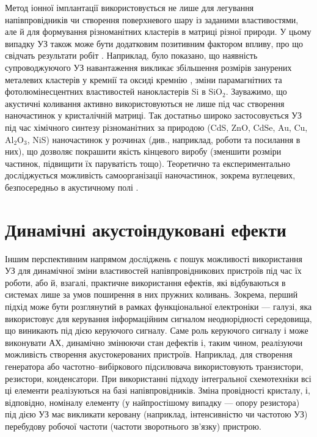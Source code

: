 Метод іонної імплантації використовується не лише для легування напівпровідників чи створення поверхневого шару із заданими властивостями, але й для формування різноманітних кластерів в матриці різної природи.
У цьому випадку УЗ також може бути додатковим позитивним фактором впливу, про що свідчать результати робіт \cite{Roman:2006JAP,Roman:2007APL,Roman:2010JAP,YOlikh2010JL}.
Наприклад, було показано, що наявність супроводжуючого УЗ навантаження викликає збільшення розмірів занурених металевих кластерів у кремнії \cite{Roman:2006JAP} та оксиді кремнію \cite{Roman:2007APL}, зміни парамагнітних \cite{Roman:2010JAP} та фотолюмінесцентних \cite{YOlikh2010JL} властивостей нанокластерів Si в SiO$_2$.
Зауважимо, що акустичні коливання активно використовуються не лише під час створення наночастинок у кристалічній матриці.
Так достатньо широко застосовується УЗ під час хімічного синтезу різноманітних за природою (CdS, ZnO, CdSe, Au, Cu, Al$_2$O$_3$, NiS) наночастинок у розчинах (див., наприклад, роботи \cite{US:nanoParticle,US:nanoCdSe,US:nanoCu,US:nanoCdS,US:nanoCdSNiS,US:nanoZnOAu} та посилання в них),
що дозволяє покрашити якість кінцевого виробу (зменшити розміри частинок, підвищити їх паруватість тощо).
Теоретично та експериментально досліджується можливість самоорганізації наночастинок, зокрема вуглецевих, безпосередньо в акустичному полі  \cite{US:nanoAPL2016}.



\section{Динамічні акустоіндуковані ефекти}

Іншим перспективним напрямом досліджень є пошук можливості використання УЗ для динамічної зміни властивостей напівпровідникових пристроїв під час їх роботи,
або й, взагалі, практичне використання ефектів, які відбуваються в системах лише за умов поширення в них пружних коливань.
Зокрема, перший підхід може бути розглянутий в рамках функціональної електроніки --- галузі,
яка використовує для керування інформаційним сигналом неоднорідності середовища,  що виникають під дією керуючого сигналу.
Саме роль керуючого сигналу і може виконувати АХ, динамічно змінюючи стан дефектів і, таким чином, реалізуючи можливість створення акустокерованих пристроїв.
Наприклад, для створення генератора або частотно--вибіркового підсилювача використовують транзистори, резистори, конденсатори.
При використанні підходу інтегральної схемотехніки всі ці елементи реалізуються на базі напівпровідників.
Зміна провідності кристалу, і, відповідно, номіналу елементу (у найпростішому випадку --- опору резистора) під дією УЗ
має викликати керовану (наприклад, інтенсивністю чи частотою УЗ) перебудову робочої частоти (частоти зворотнього зв'язку) пристрою.

